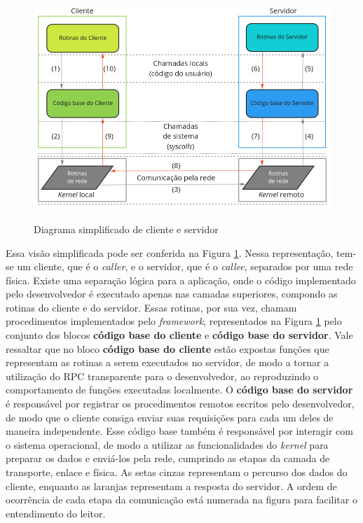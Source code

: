 \begin{figure}[ht]
    \centering
    \caption{Diagrama simplificado de cliente e servidor}
    \includegraphics[width=\textwidth]{figuras/diagramas/cap2/cliente_servidor.png} 
    \label{fig:rpc_client_servidor}
\end{figure}

Essa visão simplificada pode ser conferida na Figura \ref{fig:rpc_client_servidor}. Nessa representação, tem-se um cliente, que é o \textit{caller}, e o servidor, que é o \textit{callee}, separados por uma rede física. Existe uma separação lógica para a aplicação, onde o código implementado pelo desenvolvedor é executado apenas nas camadas superiores, compondo as rotinas do cliente e do servidor. Essas rotinas, por sua vez, chamam procedimentos implementados pelo \textit{framework}, representados na Figura \ref{fig:rpc_client_servidor} pelo conjunto dos blocos \textbf{código base do cliente} e \textbf{código base do servidor}. Vale ressaltar que no bloco \textbf{código base do cliente} estão expostas funções que representam as rotinas a serem executados no servidor, de modo a tornar a utilização do RPC transparente para o desenvolvedor, ao reproduzindo o comportamento de funções executadas localmente. O \textbf{código base do servidor} é responsável por registrar os procedimentos remotos escritos pelo desenvolvedor, de modo que o cliente consiga enviar suas requisições para cada um deles de maneira independente. Esse código base também é responsável por interagir com o sistema operacional, de modo a utilizar as funcionalidades do \textit{kernel} para preparar os dados e enviá-los pela rede, cumprindo as etapas da camada de transporte, enlace e física. As setas cinzas representam o percurso dos dados do cliente, enquanto as laranjas representam a resposta do servidor. A ordem de ocorrência de cada etapa da comunicação está numerada na figura para facilitar o entendimento do leitor.

